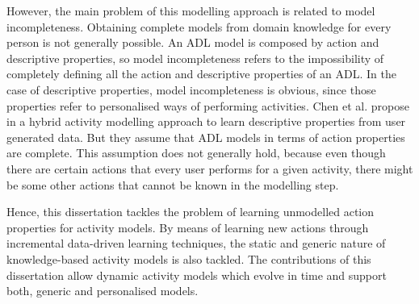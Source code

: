 However, the main problem of this modelling approach is related to model incompleteness. Obtaining complete models from domain knowledge for every person is not generally possible. An ADL model is composed by action and descriptive properties, so model incompleteness refers to the impossibility of completely defining all the action and descriptive properties of an ADL. In the case of descriptive properties, model incompleteness is obvious, since those properties refer to personalised ways of performing activities. Chen et al. propose in \cite{Chen2014} a hybrid activity modelling approach to learn descriptive properties from user generated data. But they assume that ADL models in terms of action properties are complete. This assumption does not generally hold, because even though there are certain actions that every user performs for a given activity, there might be some other actions that cannot be known in the modelling step. 

Hence, this dissertation tackles the problem of learning unmodelled action properties for activity models. By means of learning new actions through incremental data-driven learning techniques, the static and generic nature of knowledge-based activity models is also tackled. The contributions of this dissertation allow dynamic activity models which evolve in time and support both, generic and personalised models.